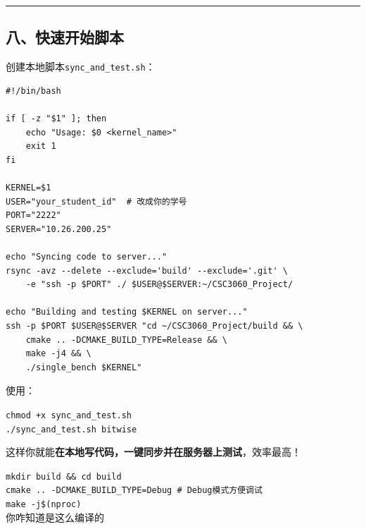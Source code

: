 \documentclass[11pt, a4paper]{article}
\begin{document}
\begin{aibox}
\begin{center}\rule{\textwidth}{0.4pt}\end{center}

\subsection*{八、快速开始脚本}

创建本地脚本\texttt{sync\_and\_test.sh}：

\begin{tcolorbox}[colback=white,colframe=gray!50!white,boxrule=0.5pt,arc=2pt,left=5pt,right=5pt,top=5pt,bottom=5pt]
\begin{verbatim}
#!/bin/bash

if [ -z "$1" ]; then
    echo "Usage: $0 <kernel_name>"
    exit 1
fi

KERNEL=$1
USER="your_student_id"  # 改成你的学号
PORT="2222"
SERVER="10.26.200.25"

echo "Syncing code to server..."
rsync -avz --delete --exclude='build' --exclude='.git' \
    -e "ssh -p $PORT" ./ $USER@$SERVER:~/CSC3060_Project/

echo "Building and testing $KERNEL on server..."
ssh -p $PORT $USER@$SERVER "cd ~/CSC3060_Project/build && \
    cmake .. -DCMAKE_BUILD_TYPE=Release && \
    make -j4 && \
    ./single_bench $KERNEL"
\end{verbatim}
\end{tcolorbox}

使用：
\begin{tcolorbox}[colback=white,colframe=gray!50!white,boxrule=0.5pt,arc=2pt,left=5pt,right=5pt,top=5pt,bottom=5pt]
\texttt{chmod +x sync\_and\_test.sh}\\
\texttt{./sync\_and\_test.sh bitwise}
\end{tcolorbox}

这样你就能\textbf{在本地写代码，一键同步并在服务器上测试}，效率最高！
\end{aibox}

\vspace{1.5em}

\begin{userbox}
\texttt{mkdir build \&\& cd build}\\
\texttt{cmake .. -DCMAKE\_BUILD\_TYPE=Debug  \# Debug模式方便调试}\\
\texttt{make -j\$(nproc)}\\[0.5em]
你咋知道是这么编译的
\end{userbox}
\end{document}
